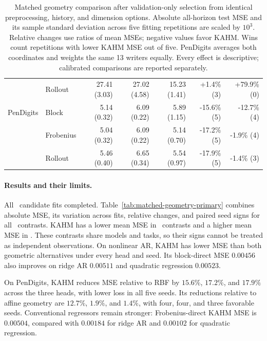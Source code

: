 \begin{table}[t]
\begin{tabular}{llrrrrr}
 & Rollout & 27.41 (3.03) & 27.02 (4.58) & 15.23 (1.41) & +1.4\% (3) & +79.9\% (0)\\
\addlinespace[3pt]
PenDigits & Block & 5.14 (0.32) & 6.09 (0.22) & 5.89 (1.15) & -15.6\% (5) & -12.7\% (4)\\
 & Frobenius & 5.04 (0.32) & 6.09 (0.22) & 5.14 (0.70) & -17.2\% (5) & -1.9\% (4)\\
 & Rollout & 5.46 (0.40) & 6.65 (0.34) & 5.54 (0.97) & -17.9\% (5) & -1.4\% (3)\\
\bottomrule
\end{tabular}
\caption{Matched geometry comparison after validation-only selection from identical preprocessing, history, and dimension options. Absolute all-horizon test MSE and its sample standard deviation across five fitting repetitions are scaled by $10^3$. Relative changes use ratios of mean MSEs; negative values favor KAHM. Wins count repetitions with lower KAHM MSE out of five. PenDigits averages both coordinates and weights the same 13 writers equally. Every effect is descriptive; calibrated comparisons are reported separately.}
\label{tab:matched-geometry-primary}
\label{tab:matched-geometry-mse}
\end{table}


\paragraph{Results and their limits.}
All \MatchedCandidates\ candidate fits completed. Table~\ref{tab:matched-geometry-primary}
combines absolute MSE, its variation across fits, relative changes, and paired
seed signs for all \MatchedComparisons\ contrasts. KAHM has a lower mean MSE
in \MatchedImproved\ contrasts and a higher mean MSE
in \MatchedDegraded. These contrasts share models and tasks, so their signs
cannot be treated as independent observations.
On nonlinear AR, KAHM has lower MSE than both geometric alternatives under every head and
seed. Its block-direct MSE $0.00456$ also improves on ridge AR $0.00511$ and
quadratic regression $0.00523$.

On PenDigits, KAHM reduces MSE relative to RBF by $15.6\%$, $17.2\%$, and
$17.9\%$ across the three heads, with lower loss in all five seeds. Its
reductions relative to affine geometry are $12.7\%$, $1.9\%$, and $1.4\%$,
with four, four, and three favorable seeds. Conventional regressors remain
stronger: Frobenius-direct KAHM MSE is $0.00504$, compared with $0.00184$
for ridge AR and $0.00102$ for quadratic regression.

